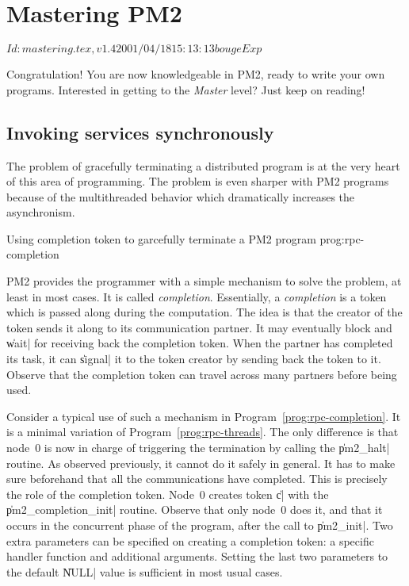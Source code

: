 \chapter{Mastering PM2}

\stamp $Id: mastering.tex,v 1.4 2001/04/18 15:13:13 bouge Exp $

Congratulation! You are now knowledgeable in PM2, ready to write your
own programs.  Interested in getting to the \emph{Master} level? Just
keep on reading!

\section{Invoking services synchronously}

The problem of gracefully terminating a distributed program is at the
very heart of this area of programming. The problem is even sharper
with PM2 programs because of the multithreaded behavior which
dramatically increases the asynchronism.

 {Using completion token to
  garcefully terminate a PM2 program} {prog:rpc-completion}

PM2 provides the programmer with a simple mechanism to solve the
problem, at least in most cases. It is called \emph{completion}.
Essentially, a \emph{completion} is a token which is passed along
during the computation. The idea is that the creator of the token
sends it along to its communication partner. It may eventually block and
\|wait| for receiving back the completion token. When the partner has
completed its task, it can \|signal| it to the token creator by
sending back the token to it. Observe that the completion token can
travel across many partners before being used. 

Consider a typical use of such a mechanism in
Program~\ref{prog:rpc-completion}. It is a minimal variation of
Program~\ref{prog:rpc-threads}. The only difference is that node~0 is
now in charge of triggering the termination by calling the \|pm2_halt|
routine. As observed previously, it cannot do it safely in general.
It has to make sure beforehand that all the communications have
completed. This is precisely the role of the completion token. Node~0
creates token \|c| with the \|pm2_completion_init| routine. Observe
that only node~0 does it, and that it occurs in the concurrent phase
of the program, after the call to \|pm2_init|. Two extra parameters
can be specified on creating a completion token: a specific handler
function and additional arguments.  Setting the last two
parameters to the default \|NULL| value is sufficient in most usual
cases.

